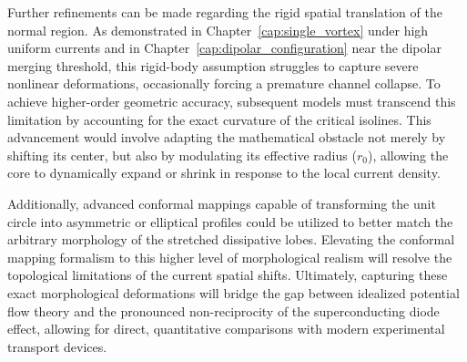 \documentclass[english,binding=0.6cm,noexaminfo]{sapthesis}
\begin{document}
Further refinements can be made regarding the rigid spatial translation of the normal region. As demonstrated in Chapter~\ref{cap:single_vortex} under high uniform currents and in Chapter~\ref{cap:dipolar_configuration} near the dipolar merging threshold, this rigid-body assumption struggles to capture severe nonlinear deformations, occasionally forcing a premature channel collapse. To achieve higher-order geometric accuracy, subsequent models must transcend this limitation by accounting for the exact curvature of the critical isolines. This advancement would involve adapting the mathematical obstacle not merely by shifting its center, but also by modulating its effective radius ($r_0$), allowing the core to dynamically expand or shrink in response to the local current density. 

Additionally, advanced conformal mappings capable of transforming the unit circle into asymmetric or elliptical profiles could be utilized to better match the arbitrary morphology of the stretched dissipative lobes. Elevating the conformal mapping formalism to this higher level of morphological realism will resolve the topological limitations of the current spatial shifts. Ultimately, capturing these exact morphological deformations will bridge the gap between idealized potential flow theory and the pronounced non-reciprocity of the superconducting diode effect, allowing for direct, quantitative comparisons with modern experimental transport devices.
\end{document}
